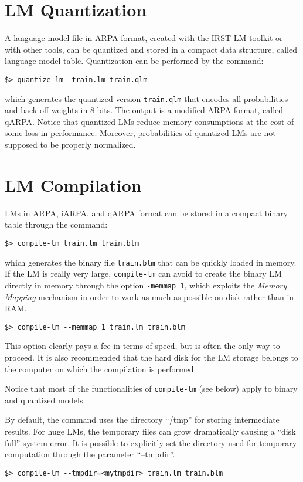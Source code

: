 \documentclass[11pt]{article}
\begin{document}
\newpage
\section{LM Quantization}
A language model file in ARPA  format, created with the IRST LM toolkit or
with other tools, can be quantized and stored in a compact data structure, 
called language model table.  Quantization can be performed by the command:

\begin{verbatim}
$> quantize-lm  train.lm train.qlm
\end{verbatim}

\noindent
which  generates   the  quantized  version  {\tt train.qlm} that  encodes all probabilities and back-off 
weights in 8 bits. The  output is a  modified ARPA format, called qARPA. Notice that quantized
LMs reduce memory consumptions at the cost of some loss in performance. Moreover, probabilities
of quantized LMs are not supposed to be properly normalized.

\newpage
\section{LM Compilation}
LMs in ARPA, iARPA, and qARPA format can be stored in a compact binary table through the command:

\begin{verbatim}
$> compile-lm train.lm train.blm
\end{verbatim}

\noindent
which generates the binary file {\tt train.blm} that can be quickly loaded in memory.  If the LM
is really very large, {\tt compile-lm} can avoid to create the binary LM directly in memory through the 
option {\tt -memmap 1}, which exploits the {\em Memory Mapping} mechanism in order to work as 
much as possible on disk rather than in RAM. \\

\begin{verbatim}
$> compile-lm --memmap 1 train.lm train.blm
\end{verbatim}
\noindent
This option clearly pays a fee  in terms of speed, but  is often the only way to proceed. It is also recommended 
that the hard disk for the LM storage belongs to the computer on which the compilation is performed.

\noindent
Notice that most of the functionalities of {\tt compile-lm} (see below) apply to binary and quantized models. 

\noindent
By default, the command uses the directory ``/tmp'' for storing
intermediate results.  For huge LMs, the temporary files can grow
dramatically causing a ``disk full'' system error.  It is possible to
explicitly set the directory used for temporary computation through the
parameter ``--tmpdir''.
\begin{verbatim}
$> compile-lm --tmpdir=<mytmpdir> train.lm train.blm
\end{verbatim}
\end{document}
